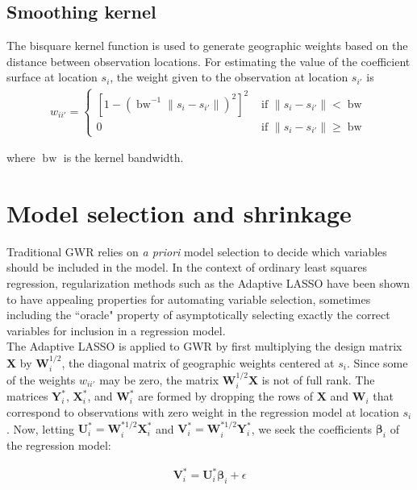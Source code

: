 \documentclass[authoryear, review, 11pt]{elsarticle}
\DeclareMathOperator*{\bw}{\mbox{bw}}
\begin{document}
	 
	 \subsection{Smoothing kernel}
	 	The bisquare kernel function is used to generate geographic weights based on the distance between observation locations. For estimating the value of the coefficient surface at location $s_i$, the weight given to the observation at location $s_{i'}$ is	
	\begin{eqnarray}
		w_{ii'} = \begin{cases} \left[ 1-\left( \bw^{-1} \|s_i-s_{i'}\| \right)^2 \right]^2 & \mbox{ if } \|s_i-s_{i'}\| < \bw \\ 0 & \mbox{ if } \|s_i-s_{i'}\| \geq \bw \end{cases}
	\end{eqnarray}
	
	where $\bw$ is the kernel bandwidth.\\
	
\section{Model selection and shrinkage \label{section:method}}
	Traditional GWR relies on \emph{a priori} model selection to decide which variables should be included in the model. In the context of ordinary least squares regression, regularization methods such as the Adaptive LASSO \citep{Zou:2006} have been shown to have appealing properties for automating variable selection, sometimes including the ``oracle" property of asymptotically selecting exactly the correct variables for inclusion in a regression model.\\
	
	The Adaptive LASSO is applied to GWR by first multiplying the design matrix $\bm{X}$ by $\bm{W}_i^{1/2}$, the diagonal matrix of geographic weights centered at $s_i$. Since some of the weights $w_{ii'}$ may be zero, the matrix $\bm{W}_i^{1/2}\bm{X}$ is not of full rank. The matrices $\bm{Y}_i^*$, $\bm{X}_i^*$, and $\bm{W}_i^*$ are formed by dropping the rows of $\bm{X}$  and $\bm{W}_i$ that correspond to observations with zero weight in the regression model at location $s_i$. Now, letting $\bm{U}_i^* = \bm{W}_i^{*1/2} \bm{X}_i^*$ and $\bm{V}_i^* = \bm{W}_i^{*1/2} \bm{Y}_i^*$, we seek the coefficients $\bm{\beta}_i$ of the regression model:
	
	\begin{eqnarray}
		\bm{V}_i^* = \bm{U}_i^* \bm{\beta}_i + \epsilon
	\end{eqnarray}
	
\end{document}
